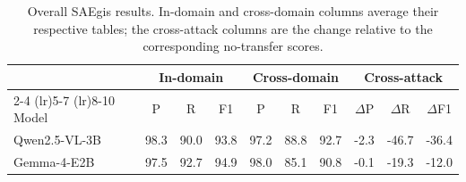 \begin{table}[t]
\centering
\caption{Overall SAEgis results. In-domain and cross-domain columns average their respective tables; the cross-attack columns are the change relative to the corresponding no-transfer scores.}
\label{tab:appendix-overall}
\begin{tabular}{lccccccccc}
\toprule
& \multicolumn{3}{c}{In-domain} & \multicolumn{3}{c}{Cross-domain} & \multicolumn{3}{c}{Cross-attack} \\
\cmidrule(lr){2-4} \cmidrule(lr){5-7} \cmidrule(lr){8-10}
Model & P & R & F1 & P & R & F1 & $\Delta$P & $\Delta$R & $\Delta$F1 \\
\midrule
Qwen2.5-VL-3B & 98.3 & 90.0 & 93.8 & 97.2 & 88.8 & 92.7 & -2.3 & -46.7 & -36.4 \\
Gemma-4-E2B & 97.5 & 92.7 & 94.9 & 98.0 & 85.1 & 90.8 & -0.1 & -19.3 & -12.0 \\
\bottomrule
\end{tabular}
\end{table}
